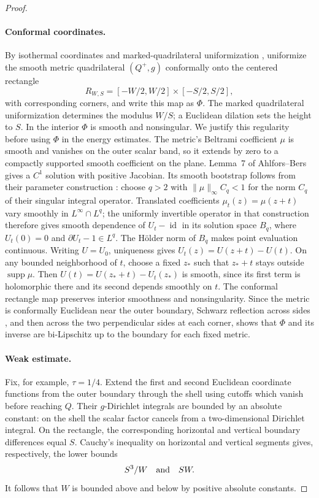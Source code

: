 \documentclass[11pt]{article}
\numberwithin{equation}{section}
\theoremstyle{definition}
\theoremstyle{remark}
\newcommand{\Id}{\operatorname{id}}
\DeclareMathOperator{\supp}{supp}
\begin{document}
\begin{proof}
\paragraph{Conformal coordinates.}
By isothermal coordinates and marked-quadrilateral uniformization
\cite[Lemma~7 and Theorem~6]{AhlforsBers1960}\cite[Theorem~4.31]{McMullen2023},
uniformize the smooth metric quadrilateral $(Q^+,g)$ conformally onto
the centered rectangle
\[
 R_{W,S}=[-W/2,W/2]\times[-S/2,S/2],
\]
with corresponding corners, and write this map as $\Phi$.  The marked
quadrilateral uniformization determines the modulus $W/S$; a Euclidean
dilation sets the height to $S$.  In the interior $\Phi$ is smooth and
nonsingular. We justify this regularity before using $\Phi$ in the
energy estimates.
The metric's
Beltrami coefficient $\mu$ is smooth and vanishes on the outer scalar
band, so it extends by zero to a compactly supported smooth coefficient
on the plane. Lemma~7 of Ahlfors--Bers gives a $C^1$ solution with
positive Jacobian. Its smooth bootstrap follows from their
parameter construction \cite[Section~2, Theorem~2]{AhlforsBers1960}:
choose $q>2$ with $\|\mu\|_\infty C_q<1$ for the norm $C_q$ of
their singular integral operator. Translated coefficients
$\mu_t(z)=\mu(z+t)$ vary smoothly in $L^\infty\cap L^q$; the
uniformly invertible operator in that construction therefore gives
smooth dependence of $U_t-\Id$ in its solution space $B_q$, where
$U_t(0)=0$ and $\partial U_t-1\in L^q$. The H\"older norm of $B_q$
makes point evaluation continuous.
Writing $U=U_0$, uniqueness gives $U_t(z)=U(z+t)-U(t)$. On any bounded neighborhood
of $t$, choose a fixed $z_*$ such that $z_*+t$ stays outside
$\supp\mu$. Then
$U(t)=U(z_*+t)-U_t(z_*)$ is smooth, since its first term is
holomorphic there and its second depends smoothly on $t$.
The conformal rectangle map preserves interior smoothness and
nonsingularity. Since the metric is conformally Euclidean near the outer
boundary, Schwarz reflection across sides
\cite[Chapter~4, Section~6.5, Theorem~24]{Ahlfors1979}, and then across the two
perpendicular sides at each corner, shows that $\Phi$ and its inverse
are bi-Lipschitz up to the boundary for each fixed metric.

\paragraph{Weak estimate.}
Fix, for example, $\tau=1/4$. Extend the first
and second Euclidean coordinate functions from the outer boundary
through the shell using cutoffs which vanish before reaching $Q$.
Their $g$-Dirichlet integrals are bounded by an absolute constant:
on the shell the scalar factor cancels from a two-dimensional
Dirichlet integral.  On the rectangle, the corresponding horizontal
and vertical boundary differences equal $S$.  Cauchy's inequality on
horizontal and vertical segments gives, respectively, the lower bounds
\begin{equation}
 S^3/W\quad\hbox{and}\quad SW.
 \label{lt:rectangle-lower}
\end{equation}
It follows that $W$ is bounded above and below by positive absolute
constants.


\end{proof}
\end{document}
